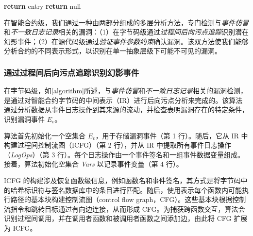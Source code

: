 \begin{algorithm}[t]
\begin{algorithmic}[1]
    \State \textbf{return} entry
  \Else 
    \State \textbf{return} null  \label{end:taintanalysis}
  \EndIf 
  
\EndProcedure 


  \end{algorithmic}
  \label{algorithm}
\end{algorithm}


在智能合约级，我们通过一种由两部分组成的多层分析方法，专门检测与\emph{事件仿冒}和\emph{不一致日志记录}相关的漏洞：（1）在字节码级通过\emph{过程间后向污点追踪}识别潜在幻影事件；（2）在源代码级通过\emph{验证事件参数约束}确认漏洞。该双方法使我们能够分析合约的不同表示形式，以识别在单一抽象层级下可能不可见的漏洞。

\subsubsection{通过过程间后向污点追踪识别幻影事件}
在字节码级，如\cref{algorithm}所述，与\emph{事件仿冒}和\emph{不一致日志记录}相关的漏洞检测，是通过对智能合约字节码的中间表示（IR）进行后向污点分析来完成的。该算法通过分析数据从事件日志操作到其来源的流动，并检查表明漏洞存在的特定条件，识别漏洞事件 \(E_v\)。

算法首先初始化一个空集合 \(E_v\)，用于存储漏洞事件（第 1 行）。随后，它从 IR 中构建过程间控制流图（ICFG）（第 2 行），并从 IR 中提取所有事件日志操作（\textit{LogOps}）（第 3 行）。每个日志操作由一个事件签名和一组事件数据变量组成。接着，算法初始化空集合 \textit{Vars} 以记录事件变量（第 4 行）。

ICFG 的构建涉及恢复函数级信息，例如函数名和事件签名，其方式是将字节码中的哈希标识符与签名数据库中的条目进行匹配。随后，使用表示每个函数内可能执行路径的基本块构建控制流图（control flow graph，CFG）。这些基本块根据控制流指令和跳转目标通过有向边连接，从而形成 CFG。为捕获跨函数交互，算法会识别过程间调用，并在调用者函数和被调用者函数之间添加边，由此将 CFG 扩展为 ICFG。

